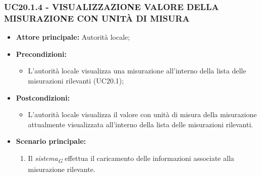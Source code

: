 \subsubsection{UC20.1.4 - VISUALIZZAZIONE VALORE DELLA MISURAZIONE CON UNITÀ DI MISURA}
\begin{itemize}
    \item \textbf{Attore principale:} Autorità locale;
    \item \textbf{Precondizioni:}
        \begin{itemize}
                \item L'autorità locale visualizza una misurazione all'interno della lista delle misurazioni rilevanti (UC20.1);
        \end{itemize}
    \item \textbf{Postcondizioni:}
        \begin{itemize}
            \item L'autorità locale visualizza il valore con unità di misura della misurazione attualmente visualizzata all'interno della lista delle misurazioni rilevanti.
        \end{itemize}
    \item \textbf{Scenario principale:}
        \begin{enumerate}
            \item Il \textit{sistema}\textsubscript{\textit{G}} effettua il caricamento delle informazioni associate alla misurazione rilevante.
        \end{enumerate}
\end{itemize}